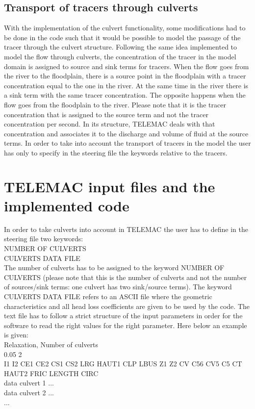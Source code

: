 \subsection{Transport of tracers through culverts}


With the implementation of the culvert functionality,
some modifications had to be done in the code such that
it would be possible to model the passage of the tracer through the culvert structure.
Following the same idea implemented to model the flow through culverts,
the concentration of the tracer in the model domain is assigned to source and sink terms
for tracers. When the flow goes from the river to the floodplain,
there is a source point in the floodplain with a tracer concentration equal to the one
in the river. At the same time in the river there is a sink term with the same tracer
concentration. The opposite happens when the flow goes from the floodplain to the river.
Please note that it is the tracer concentration that is assigned to the source term
and not the tracer concentration per second.
In its structure, TELEMAC deals with that concentration and associates it to the
discharge and volume of fluid at the source terms.
In order to take into account the transport of tracers in the model the
user has only to specify in the steering file the keywords relative to the tracers.

\section{TELEMAC input files and the implemented code}

In order to take culverts into account in TELEMAC the user has to define in the
steering file two keywords: \\
NUMBER OF CULVERTS \\
CULVERTS DATA FILE\\

The number of culverts has to be assigned to the keyword NUMBER OF CULVERTS
(please note that this is the number of culverts and not the number of sources/sink terms:
one culvert has two sink/source terms).
The keyword CULVERTS DATA FILE refers to an ASCII file where the geometric characteristics
and all head loss coefficients are given to be used by the code.
The text file has to follow a strict structure of the input parameters in order
for the software to read the right values for the right parameter.
Here below an example is given:\\

Relaxation, Number of culverts\\
0.05 2\\
I1  I2  CE1  CE2  CS1  CS2  LRG HAUT1 CLP LBUS Z1 Z2 CV  C56  CV5  C5 CT HAUT2 FRIC LENGTH CIRC\\
data culvert 1  ...\\
data culvert 2 ...\\
... \\

